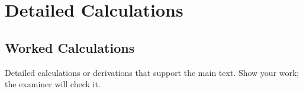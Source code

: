 
\chapter{Detailed Calculations}
\label{app:calculations}

\section{Worked Calculations}

Detailed calculations or derivations that support the main text. Show
your work; the examiner will check it.
